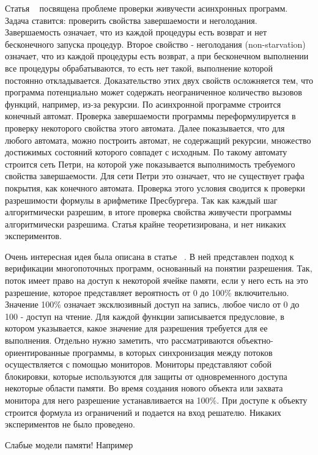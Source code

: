 Статья ~\cite{Ganty:2009:POPL} посвящена проблеме проверки живучести асинхронных программ. Задача ставится: проверить свойства завершаемости и неголодания. Завершаемость означает, что из каждой процедуры есть возврат и нет бесконечного запуска процедур. Второе свойство - неголодания (non-starvation) означает, что из каждой процедуры есть возврат, а при бесконечном выполнении все процедуры обрабатываются, то есть нет такой, выполнение которой постоянно откладывается. 
Доказательство этих двух свойств осложняется тем, что программа потенциально может содержать неограниченное количество вызовов функций, например, из-за рекурсии.
По асинхронной программе строится конечный автомат. Проверка завершаемости программы переформулируется в проверку некоторого свойства этого автомата. Далее показывается, что для любого автомата, можно построить автомат, не содержащий рекурсии, множество достижимых состояний которого совпадет с исходным. По такому автомату строится сеть Петри, на которой уже показывается выполнимость требуемого свойства завершаемости. Для сети Петри это означает, что не существует графа покрытия, как конечного автомата. Проверка этого условия сводится к проверки разрешимости формулы в арифметике Пресбургера. Так как каждый шаг алгоритмически разрешим, в итоге проверка свойства живучести программы алгоритмически разрешима. 
Статья крайне теоретизирована, и нет никаких экспериментов.

Очень интересная идея была описана в статье ~\cite{Leino:2009}. В ней представлен подход к верификации многопоточных программ, основанный на понятии разрешения. Так, поток имеет право на доступ к некоторой ячейке памяти, если у него есть на это разрешение, которое представляет вероятность от 0 до 100\% включительно. Значение 100\% означает эксклюзивный доступ на запись, любое число от 0 до 100 - доступ на чтение. Для каждой функции записывается предусловие, в котором указывается, какое значение для разрешения требуется для ее выполнения. Отдельно нужно заметить, что рассматриваются объектно-ориентированные программы, в которых синхронизация между потоков осуществляется с помощью мониторов. Мониторы представляют собой блокировки, которые используются для защиты от одновременного доступа некоторые области памяти. Во время создания нового объекта или захвата монитора для него разрешение устанавливается на 100\%. При доступе к объекту строится формула из ограничений и подается на вход решателю.
Никаких экспериментов не было проведено.

Слабые модели памяти! Например ~\cite{Zhang:2015:PLDI, Zhang:2015}

